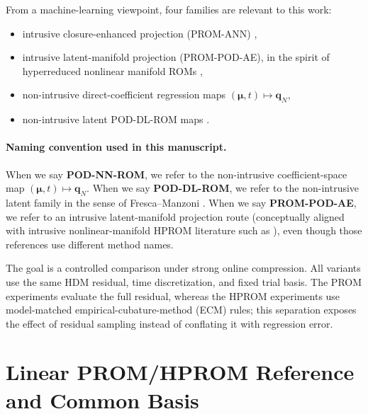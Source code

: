 \documentclass[11pt]{article}
\begin{document}
From a machine-learning viewpoint, four families are relevant to this work:
\begin{itemize}
\item intrusive closure-enhanced projection (PROM-ANN) \cite{barnett2023neural},
\item intrusive latent-manifold projection (PROM-POD-AE), in the spirit of hyperreduced nonlinear manifold ROMs \cite{romor2025explicable},
\item non-intrusive direct-coefficient regression maps $(\bm\mu,t)\mapsto\mathbf q_N$,
\item non-intrusive latent POD-DL-ROM maps \cite{fresca2022pod}.
\end{itemize}

\paragraph{Naming convention used in this manuscript.}
When we say \textbf{POD-NN-ROM}, we refer to the non-intrusive coefficient-space
map $(\bm\mu,t)\mapsto\mathbf q_N$. When we say \textbf{POD-DL-ROM}, we refer to
the non-intrusive latent family in the sense of Fresca--Manzoni
\cite{fresca2022pod}. When we say \textbf{PROM-POD-AE}, we refer
to an intrusive latent-manifold projection route (conceptually aligned with
intrusive nonlinear-manifold HPROM literature such as \cite{romor2025explicable}),
even though those references use different method names.

The goal is a controlled comparison under strong online compression.  All variants use the same HDM residual, time discretization, and fixed trial basis.  The PROM experiments evaluate the full residual, whereas the HPROM experiments use model-matched empirical-cubature-method (ECM) rules; this separation exposes the effect of residual sampling instead of conflating it with regression error.

\section{Linear PROM/HPROM Reference and Common Basis}
\label{sec:linear-rom}
\end{document}
